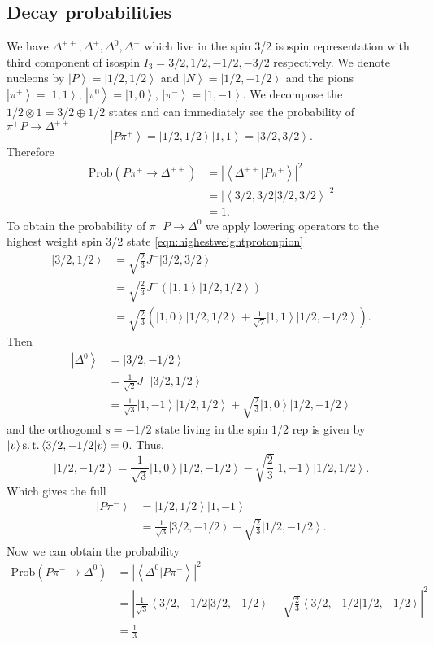 \documentclass[main.tex]{subfiles}
\begin{document}
\subsection{Decay probabilities}
We have $\Delta^{++}, \Delta^{+}, \Delta^{0}, \Delta^{-}$ which live in the spin 3/2 isospin representation with third component of isospin $I_3=3/2,1/2,-1/2,-3/2$ respectively.
We denote nucleons by $\left|P\right>=\left|1/2,1/2\right>$ and $\left|N\right>=\left|1/2,-1/2\right>$ and the pions $\left|\pi^+\right>=\left|1,1\right>$, $\left|\pi^0\right>=\left|1,0\right>$, $\left|\pi^-\right>=\left|1,-1\right>$.
We decompose the $1/2\otimes1=3/2\oplus1/2$ states and can immediately see the probability of $\pi^+P\rightarrow\Delta^{++}$
\begin{equation}\label{eqn:highestweightprotonpion}
\left|P\pi^+\right>=\left|1/2,1/2\right>\left|1,1\right>=\left|3/2,3/2\right>.
\end{equation}
Therefore
\begin{align}
\text{Prob}(P\pi^+\rightarrow\Delta^{++})&=|\left<\Delta^{++}|P\pi^+\right>|^2\\
&=|\left<3/2,3/2|3/2,3/2\right>|^2\\
&=1.
\end{align}
To obtain the probability of $\pi^-P\rightarrow\Delta^0$ we apply lowering operators to the highest weight spin 3/2 state \eqref{eqn:highestweightprotonpion}
\begin{align}
\left|3/2,1/2\right>&=\sqrt{\frac{2}{3}}J^-\left|3/2,3/2\right>\\
&=\sqrt{\frac{2}{3}}J^-(\left|1,1\right>\left|1/2,1/2\right>)\\
&=\sqrt{\frac{2}{3}}(\left|1,0\right>\left|1/2,1/2\right>+\frac{1}{\sqrt{2}}\left|1,1\right>\left|1/2,-1/2\right>).
\end{align}
Then
\begin{align}
\left|\Delta^0\right>&=\left|3/2,-1/2\right>\\
&=\frac{1}{\sqrt{2}}J^-\left|3/2,1/2\right>\\
&=\frac{1}{\sqrt{3}}\left|1,-1\right>\left|1/2,1/2\right>+\sqrt{\frac{2}{3}}\left|1,0\right>\left|1/2,-1/2\right>
\end{align}
and the orthogonal $s=-1/2$ state living in the spin $1/2$ rep is given by $\left|v\right>\operatorname{s.t.}\left<3/2,-1/2|v\right>=0$. Thus,
\begin{equation}
\left|1/2,-1/2\right>= \frac{1}{\sqrt{3}}\left|1,0\right>\left|1/2,-1/2\right> - \sqrt{\frac{2}{3}}\left|1,-1\right>\left|1/2,1/2\right>.
\end{equation}
Which gives the full
\begin{align}
\left|P\pi^-\right>&=\left|1/2,1/2\right>\left|1,-1\right>\\
&=\frac{1}{\sqrt{3}}\left|3/2,-1/2\right>- \sqrt{\frac{2}{3}}\left|1/2,-1/2\right>.
\end{align}
Now we can obtain the probability
\begin{align}
\text{Prob}(P\pi^-\rightarrow\Delta^{0})&=|\left<\Delta^{0}|P\pi^-\right>|^2\\
&=\left|\frac{1}{\sqrt{3}}\left<3/2,-1/2|3/2,-1/2\right>-\sqrt{\frac{2}{3}}\left<3/2,-1/2|1/2,-1/2\right>\right|^2\\
&=\frac{1}{3}
\end{align}
\end{document}
